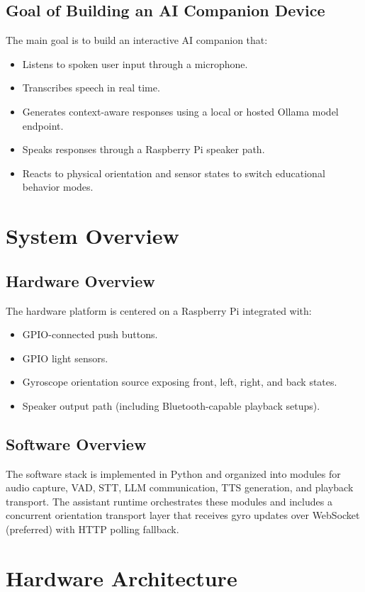 \documentclass[12pt,a4paper]{article}
\begin{document}
\subsection{Goal of Building an AI Companion Device}
The main goal is to build an interactive AI companion that:
\begin{itemize}
    \item Listens to spoken user input through a microphone.
    \item Transcribes speech in real time.
    \item Generates context-aware responses using a local or hosted Ollama model endpoint.
    \item Speaks responses through a Raspberry Pi speaker path.
    \item Reacts to physical orientation and sensor states to switch educational behavior modes.
\end{itemize}

\section{System Overview}

\subsection{Hardware Overview}
The hardware platform is centered on a Raspberry Pi integrated with:
\begin{itemize}
    \item GPIO-connected push buttons.
    \item GPIO light sensors.
    \item Gyroscope orientation source exposing front, left, right, and back states.
    \item Speaker output path (including Bluetooth-capable playback setups).
\end{itemize}

\subsection{Software Overview}
The software stack is implemented in Python and organized into modules for audio capture, VAD, STT, LLM communication, TTS generation, and playback transport. The assistant runtime orchestrates these modules and includes a concurrent orientation transport layer that receives gyro updates over WebSocket (preferred) with HTTP polling fallback.

\section{Hardware Architecture}
\end{document}
